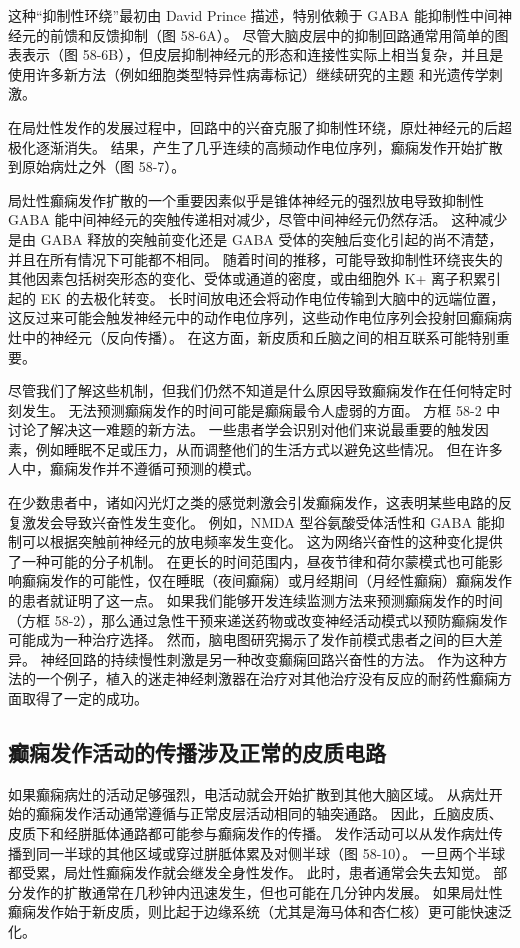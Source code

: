 这种“抑制性环绕”最初由 David Prince 描述，特别依赖于 GABA 能抑制性中间神经元的前馈和反馈抑制（图 58-6A）。 尽管大脑皮层中的抑制回路通常用简单的图表表示（图 58-6B），但皮层抑制神经元的形态和连接性实际上相当复杂，并且是使用许多新方法（例如细胞类型特异性病毒标记）继续研究的主题 和光遗传学刺激。

在局灶性发作的发展过程中，回路中的兴奋克服了抑制性环绕，原灶神经元的后超极化逐渐消失。 结果，产生了几乎连续的高频动作电位序列，癫痫发作开始扩散到原始病灶之外（图 58-7）。

局灶性癫痫发作扩散的一个重要因素似乎是锥体神经元的强烈放电导致抑制性 GABA 能中间神经元的突触传递相对减少，尽管中间神经元仍然存活。 这种减少是由 GABA 释放的突触前变化还是 GABA 受体的突触后变化引起的尚不清楚，并且在所有情况下可能都不相同。 随着时间的推移，可能导致抑制性环绕丧失的其他因素包括树突形态的变化、受体或通道的密度，或由细胞外 K+ 离子积累引起的 EK 的去极化转变。 长时间放电还会将动作电位传输到大脑中的远端位置，这反过来可能会触发神经元中的动作电位序列，这些动作电位序列会投射回癫痫病灶中的神经元（反向传播）。 在这方面，新皮质和丘脑之间的相互联系可能特别重要。

尽管我们了解这些机制，但我们仍然不知道是什么原因导致癫痫发作在任何特定时刻发生。 无法预测癫痫发作的时间可能是癫痫最令人虚弱的方面。 方框 58-2 中讨论了解决这一难题的新方法。 一些患者学会识别对他们来说最重要的触发因素，例如睡眠不足或压力，从而调整他们的生活方式以避免这些情况。 但在许多人中，癫痫发作并不遵循可预测的模式。

在少数患者中，诸如闪光灯之类的感觉刺激会引发癫痫发作，这表明某些电路的反复激发会导致兴奋性发生变化。 例如，NMDA 型谷氨酸受体活性和 GABA 能抑制可以根据突触前神经元的放电频率发生变化。 这为网络兴奋性的这种变化提供了一种可能的分子机制。 在更长的时间范围内，昼夜节律和荷尔蒙模式也可能影响癫痫发作的可能性，仅在睡眠（夜间癫痫）或月经期间（月经性癫痫）癫痫发作的患者就证明了这一点。 如果我们能够开发连续监测方法来预测癫痫发作的时间（方框 58-2），那么通过急性干预来递送药物或改变神经活动模式以预防癫痫发作可能成为一种治疗选择。 然而，脑电图研究揭示了发作前模式患者之间的巨大差异。 神经回路的持续慢性刺激是另一种改变癫痫回路兴奋性的方法。 作为这种方法的一个例子，植入的迷走神经刺激器在治疗对其他治疗没有反应的耐药性癫痫方面取得了一定的成功。

\subsection{癫痫发作活动的传播涉及正常的皮质电路}
如果癫痫病灶的活动足够强烈，电活动就会开始扩散到其他大脑区域。 从病灶开始的癫痫发作活动通常遵循与正常皮层活动相同的轴突通路。 因此，丘脑皮质、皮质下和经胼胝体通路都可能参与癫痫发作的传播。 发作活动可以从发作病灶传播到同一半球的其他区域或穿过胼胝体累及对侧半球（图 58-10）。 一旦两个半球都受累，局灶性癫痫发作就会继发全身性发作。 此时，患者通常会失去知觉。 部分发作的扩散通常在几秒钟内迅速发生，但也可能在几分钟内发展。 如果局灶性癫痫发作始于新皮质，则比起于边缘系统（尤其是海马体和杏仁核）更可能快速泛化。

